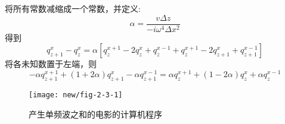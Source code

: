 将所有常数减缩成一个常数，并定义:
\begin{equation}
\alpha=\frac{v\Delta z}{-i\omega^4\Delta x^2}
\label{eq:ex2.3.3}
\end{equation}
得到
\begin{equation*}
q_{z+1}^x-q_z^x=\alpha[q_z^{x+1}-2q_z^x+q_z^{x-1}+q_z^{x+1}-2q_{z+1}^x+q_{z+1}^{x-1}]
\end{equation*}
将各未知数置于左端，则
\begin{equation}
-\alpha q_{z+1}^{x+1}+(1+2\alpha)q_{z+1}^x-\alpha q_{z+1}^{x-1}=\alpha q_z^{x+1}+(1-2\alpha)q_z^x+
\alpha q_z^{x-1}
\label{eq:ex2.3.4}
\end{equation}
\begin{figure}[H]
\centering
\texttt{[image: new/fig-2-3-1]}
\caption[code2-3-1]{产生单频波之和的电影的计算机程序}
\label{fig:new/fig-2-3-1}
\end{figure}
